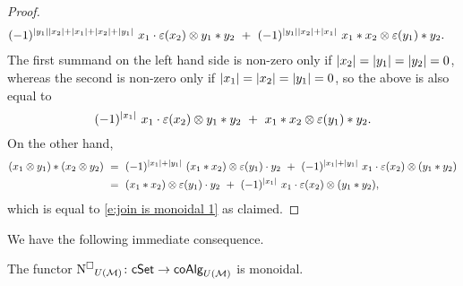 \begin{proof}
\begin{equation*}
\begin{split}
	(-1)^{\bars{y_1} \bars{x_2} + \bars{x_1} + \bars{x_2} + \bars{y_1}} \ x_1 \cdot \varepsilon(x_2) \otimes y_1 \ast y_2 \ & + \ 
	(-1)^{\bars{y_1} \bars{x_2} + \bars{x_1}} \ x_1 \ast x_2 \otimes \varepsilon(y_1) \ast y_2.
	\end{split}
	\end{equation*}
	The first summand on the left hand side is non-zero only if $\vert{x_2}\vert = \vert{y_1}\vert = \vert{y_2}\vert = 0$, whereas the second is non-zero only if $\vert{x_1}\vert = \vert{x_2}\vert = \vert{y_1}\vert = 0$, so the above is also equal to
	\begin{equation} \label{e:join is monoidal 1}
	(-1)^{\bars{x_1}} \ x_1 \cdot \varepsilon(x_2) \otimes y_1 \ast y_2 \ + \ 
	x_1 \ast x_2 \otimes \varepsilon(y_1) \ast y_2.
	\end{equation}
	On the other hand,
	\begin{align*}
	(x_1 \otimes y_1) \ast (x_2 \otimes y_2) \ & =\ 
	(-1)^{\bars{x_1} + \bars{y_1}} \ (x_1 \ast x_2) \otimes \varepsilon(y_1) \cdot y_2 \ +\
	(-1)^{\bars{x_1} + \bars{y_1}} \ x_1 \cdot \varepsilon(x_2) \otimes (y_1 \ast y_2) \\ \ & =\ 
	(x_1 \ast x_2) \otimes \varepsilon(y_1) \cdot y_2 \ +\
	(-1)^{\bars{x_1}} \ x_1 \cdot \varepsilon(x_2) \otimes (y_1 \ast y_2),
	\end{align*}
	which is equal to \eqref{e:join is monoidal 1} as claimed.
\end{proof}

We have the following immediate consequence.

\begin{theorem} \label{t:lift chains on cSet to UM coAlg is monoidal}
    The functor $\operatorname{N^{\square}}_{U(\mathcal{M})} \colon \mathsf{cSet} \to \mathsf{coAlg}_{U(\mathcal{M})}$ is monoidal.
\end{theorem}